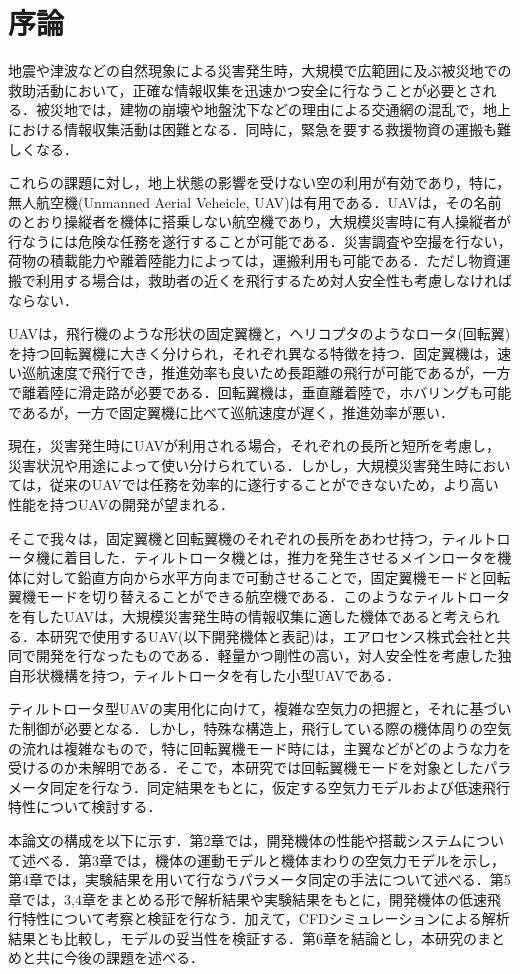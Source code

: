 
\chapter{序論}
\label{intro}

地震や津波などの自然現象による災害発生時，大規模で広範囲に及ぶ被災地での救助活動において，正確な情報収集を迅速かつ安全に行なうことが必要とされる．被災地では，建物の崩壊や地盤沈下などの理由による交通網の混乱で，地上における情報収集活動は困難となる．同時に，緊急を要する救援物資の運搬も難しくなる．

これらの課題に対し，地上状態の影響を受けない空の利用が有効であり，特に，無人航空機(Unmanned Aerial Veheicle, UAV)は有用である．UAVは，その名前のとおり操縦者を機体に搭乗しない航空機であり，大規模災害時に有人操縦者が行なうには危険な任務を遂行することが可能である．災害調査や空撮を行ない，荷物の積載能力や離着陸能力によっては，運搬利用も可能である．ただし物資運搬で利用する場合は，救助者の近くを飛行するため対人安全性も考慮しなければならない．

UAVは，飛行機のような形状の固定翼機と，ヘリコプタのようなロータ(回転翼)を持つ回転翼機に大きく分けられ，それぞれ異なる特徴を持つ．固定翼機は，速い巡航速度で飛行でき，推進効率も良いため長距離の飛行が可能であるが，一方で離着陸に滑走路が必要である．回転翼機は，垂直離着陸で，ホバリングも可能であるが，一方で固定翼機に比べて巡航速度が遅く，推進効率が悪い．

現在，災害発生時にUAVが利用される場合，それぞれの長所と短所を考慮し，災害状況や用途によって使い分けられている．しかし，大規模災害発生時においては，従来のUAVでは任務を効率的に遂行することができないため，より高い性能を持つUAVの開発が望まれる．

そこで我々は，固定翼機と回転翼機のそれぞれの長所をあわせ持つ，ティルトロータ機に着目した．ティルトロータ機とは，推力を発生させるメインロータを機体に対して鉛直方向から水平方向まで可動させることで，固定翼機モードと回転翼機モードを切り替えることができる航空機である．このようなティルトロータを有したUAVは，大規模災害発生時の情報収集に適した機体であると考えられる．本研究で使用するUAV(以下開発機体と表記)は，エアロセンス株式会社と共同で開発を行なったものである．軽量かつ剛性の高い，対人安全性を考慮した独自形状機構を持つ，ティルトロータを有した小型UAVである．

ティルトロータ型UAVの実用化に向けて，複雑な空気力の把握と，それに基づいた制御が必要となる．しかし，特殊な構造上，飛行している際の機体周りの空気の流れは複雑なもので，特に回転翼機モード時には，主翼などがどのような力を受けるのか未解明である．そこで，本研究では回転翼機モードを対象としたパラメータ同定を行なう．同定結果をもとに，仮定する空気力モデルおよび低速飛行特性について検討する．

本論文の構成を以下に示す．第2章では，開発機体の性能や搭載システムについて述べる．第3章では，機体の運動モデルと機体まわりの空気力モデルを示し，第4章では，実験結果を用いて行なうパラメータ同定の手法について述べる．第5章では，3,4章をまとめる形で解析結果や実験結果をもとに，開発機体の低速飛行特性について考察と検証を行なう．加えて，CFDシミュレーションによる解析結果とも比較し，モデルの妥当性を検証する．第6章を結論とし，本研究のまとめと共に今後の課題を述べる．

